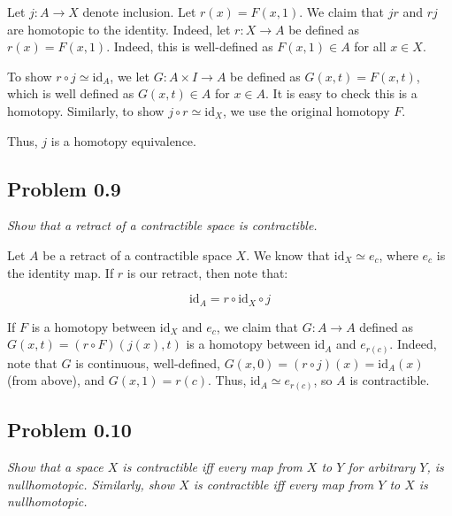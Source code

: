\documentclass[10pt, oneside]{amsart}
\begin{document}
    Let $j : A \rightarrow X$ denote inclusion. Let $r(x) = F(x, 1)$. We claim that $jr$ and $rj$ are homotopic to the identity. Indeed, let $r : X \rightarrow A$ be defined as $r(x) = F(x, 1)$.
    Indeed, this is well-defined as $F(x, 1) \in A$ for all $x \in X$.
    \newline

    To show $r \circ j \simeq \text{id}_A$, we let $G : A \times I \rightarrow A$ be defined as $G(x, t) = F(x, t)$, which is well defined as $G(x, t) \in A$ for $x \in A$. It is easy to check
    this is a homotopy. Similarly, to show $j \circ r \simeq \text{id}_X$, we use the original homotopy $F$.
    \newline

    Thus, $j$ is a homotopy equivalence.

    \hrulefill

    \subsection{Problem 0.9}

    \textit{Show that a retract of a contractible space is contractible.}
    \newline

    Let $A$ be a retract of a contractible space $X$. We know that $\text{id}_X \simeq e_c$, where $e_c$ is the identity map. If $r$ is our retract, then note that:

    $$\text{id}_{A} = r \circ \text{id}_{X} \circ j$$

    If $F$ is a homotopy between $\text{id}_{X}$ and $e_c$, we claim that $G : A \rightarrow A$ defined as $G(x, t) = (r \circ F)(j(x), t)$ is a homotopy between $\text{id}_{A}$ and
    $e_{r(c)}$. Indeed, note that $G$ is continuous, well-defined, $G(x, 0) = (r \circ j)(x) = \text{id}_{A}(x)$ (from above), and $G(x, 1) = r(c)$. Thus, $\text{id}_{A} \simeq e_{r(c)}$, so $A$ is contractible.

    \hrulefill

    \subsection{Problem 0.10}

    \textit{Show that a space $X$ is contractible iff every map from $X$ to $Y$ for arbitrary $Y$, is nullhomotopic. Similarly, show $X$ is contractible iff every map from $Y$ to $X$ is nullhomotopic.}
    \newline
\end{document}

